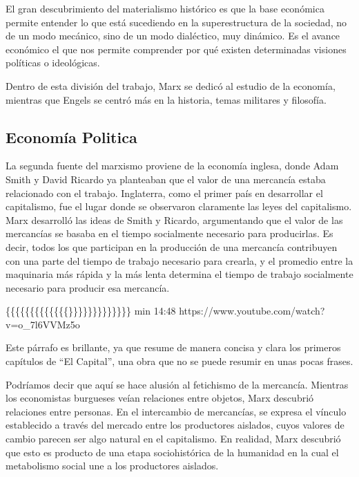 \documentclass[
  jou,
  floatsintext,
  longtable,
  a4paper,
  nolmodern,
  notxfonts,
  notimes,
  12pt,
  colorlinks=true,linkcolor=blue,citecolor=blue,urlcolor=blue]{apa7}
\begin{document}
El gran descubrimiento del materialismo histórico es que la base
económica permite entender lo que está sucediendo en la superestructura
de la sociedad, no de un modo mecánico, sino de un modo dialéctico, muy
dinámico. Es el avance económico el que nos permite comprender por qué
existen determinadas visiones políticas o ideológicas.

Dentro de esta división del trabajo, Marx se dedicó al estudio de la
economía, mientras que Engels se centró más en la historia, temas
militares y filosofía.

\subsection{Economía Politica}\label{economuxeda-politica}

La segunda fuente del marxismo proviene de la economía inglesa, donde
Adam Smith y David Ricardo ya planteaban que el valor de una mercancía
estaba relacionado con el trabajo. Inglaterra, como el primer país en
desarrollar el capitalismo, fue el lugar donde se observaron claramente
las leyes del capitalismo. Marx desarrolló las ideas de Smith y Ricardo,
argumentando que el valor de las mercancías se basaba en el tiempo
socialmente necesario para producirlas. Es decir, todos los que
participan en la producción de una mercancía contribuyen con una parte
del tiempo de trabajo necesario para crearla, y el promedio entre la
maquinaria más rápida y la más lenta determina el tiempo de trabajo
socialmente necesario para producir esa mercancía.

\{\{\{\{\{\{\{\{\{\{\{\{\{\}\}\}\}\}\}\}\}\}\}\}\}\} min 14:48
https://www.youtube.com/watch?v=o\_7l6VVMz5o

Este párrafo es brillante, ya que resume de manera concisa y clara los
primeros capítulos de ``El Capital'', una obra que no se puede resumir
en unas pocas frases.

Podríamos decir que aquí se hace alusión al fetichismo de la mercancía.
Mientras los economistas burgueses veían relaciones entre objetos, Marx
descubrió relaciones entre personas. En el intercambio de mercancías, se
expresa el vínculo establecido a través del mercado entre los
productores aislados, cuyos valores de cambio parecen ser algo natural
en el capitalismo. En realidad, Marx descubrió que esto es producto de
una etapa sociohistórica de la humanidad en la cual el metabolismo
social une a los productores aislados.
\end{document}
